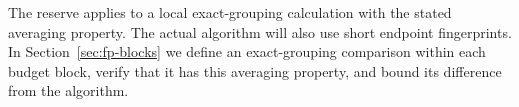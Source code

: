 The reserve applies to a local exact-grouping calculation with the stated
averaging property.  The actual algorithm will also use short endpoint
fingerprints.  In Section~\ref{sec:fp-blocks} we define an exact-grouping comparison
within each budget block, verify that it has this averaging property, and
bound its difference from the algorithm.
